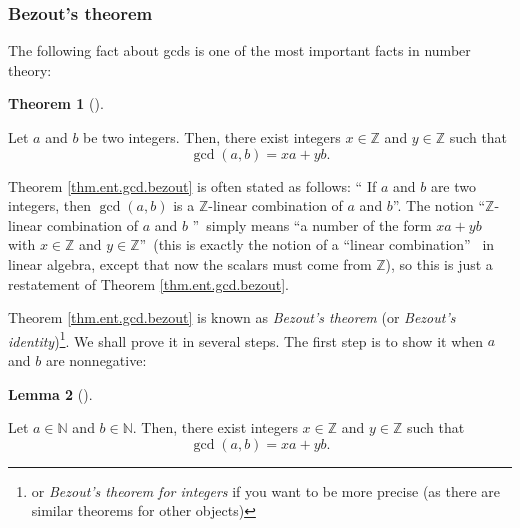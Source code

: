 \documentclass[numbers=enddot,12pt,final,onecolumn,notitlepage]{scrartcl}%
\numberwithin{exer}{subsection}
\theoremstyle{definition}
\newtheorem{theo}{Theorem}[subsection]
\newenvironment{theorem}[1][]
{\begin{theo}[#1]\begin{leftbar}}
{\end{leftbar}\end{theo}}
\newtheorem{lem}[theo]{Lemma}
\newenvironment{lemma}[1][]
{\begin{lem}[#1]\begin{leftbar}}
{\end{leftbar}\end{lem}}
\begin{document}
\subsubsection{Bezout's theorem}

The following fact about gcds is one of the most important facts in number theory:

\begin{theorem}
\label{thm.ent.gcd.bezout}Let $a$ and $b$ be two integers. Then, there exist
integers $x\in\mathbb{Z}$ and $y\in\mathbb{Z}$ such that%
\[
\gcd\left(  a,b\right)  =xa+yb.
\]

\end{theorem}

Theorem \ref{thm.ent.gcd.bezout} is often stated as follows: \textquotedblleft
If $a$ and $b$ are two integers, then $\gcd\left(  a,b\right)  $ is a
$\mathbb{Z}$-linear combination of $a$ and $b$\textquotedblright. The notion
\textquotedblleft$\mathbb{Z}$-linear combination of $a$ and $b$%
\textquotedblright\ simply means \textquotedblleft a number of the form
$xa+yb$ with $x\in\mathbb{Z}$ and $y\in\mathbb{Z}$\textquotedblright\ (this is
exactly the notion of a \textquotedblleft linear combination\textquotedblright%
\ in linear algebra, except that now the scalars must come from $\mathbb{Z}$),
so this is just a restatement of Theorem \ref{thm.ent.gcd.bezout}.

Theorem \ref{thm.ent.gcd.bezout} is known as \textit{Bezout's theorem} (or
\textit{Bezout's identity})\footnote{or \textit{Bezout's theorem for integers}
if you want to be more precise (as there are similar theorems for other
objects)}. We shall prove it in several steps. The first step is to show it
when $a$ and $b$ are nonnegative:

\begin{lemma}
\label{lem.ent.gcd.bezout.++}Let $a\in\mathbb{N}$ and $b\in\mathbb{N}$. Then,
there exist integers $x\in\mathbb{Z}$ and $y\in\mathbb{Z}$ such that%
\[
\gcd\left(  a,b\right)  =xa+yb.
\]

\end{lemma}
\end{document}
